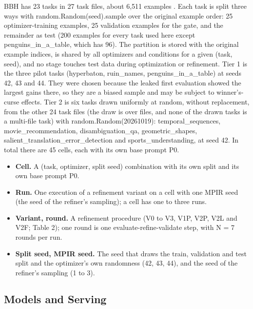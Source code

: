 \documentclass{ieeeaccess}
\begin{document}
BBH has 23 tasks in 27 task files, about 6,511 examples \cite{suzgun2023}. Each task is split three ways with random.Random(seed).sample over the original example order: 25 optimizer-training examples, 25 validation examples for the gate, and the remainder as test (200 examples for every task used here except penguins\_\allowbreak{}in\_\allowbreak{}a\_\allowbreak{}table, which has 96). The partition is stored with the original example indices, is shared by all optimizers and conditions for a given (task, seed), and no stage touches test data during optimization or refinement. Tier 1 is the three pilot tasks (hyperbaton, ruin\_\allowbreak{}names, penguins\_\allowbreak{}in\_\allowbreak{}a\_\allowbreak{}table) at seeds 42, 43 and 44. They were chosen because the leaked first evaluation showed the largest gains there, so they are a biased sample and may be subject to winner's-curse effects. Tier 2 is six tasks drawn uniformly at random, without replacement, from the other 24 task files (the draw is over files, and none of the drawn tasks is a multi-file task) with random.Random(20261019): temporal\_\allowbreak{}sequences, movie\_\allowbreak{}recommendation, disambiguation\_\allowbreak{}qa, geometric\_\allowbreak{}shapes, salient\_\allowbreak{}translation\_\allowbreak{}error\_\allowbreak{}detection and sports\_\allowbreak{}understanding, at seed 42. In total there are 45 cells, each with its own base prompt P0.

\begin{itemize}
\item \textbf{Cell.} A (task, optimizer, split seed) combination with its own split and its own base prompt P0.
\item \textbf{Run.} One execution of a refinement variant on a cell with one MPIR seed (the seed of the refiner's sampling); a cell has one to three runs.
\item \textbf{Variant, round.} A refinement procedure (V0 to V3, V1P, V2P, V2L and V2F; Table 2); one round is one evaluate-refine-validate step, with N = 7 rounds per run.
\item \textbf{Split seed, MPIR seed.} The seed that draws the train, validation and test split and the optimizer's own randomness (42, 43, 44), and the seed of the refiner's sampling (1 to 3).
\end{itemize}

\subsection{Models and Serving}
\end{document}
